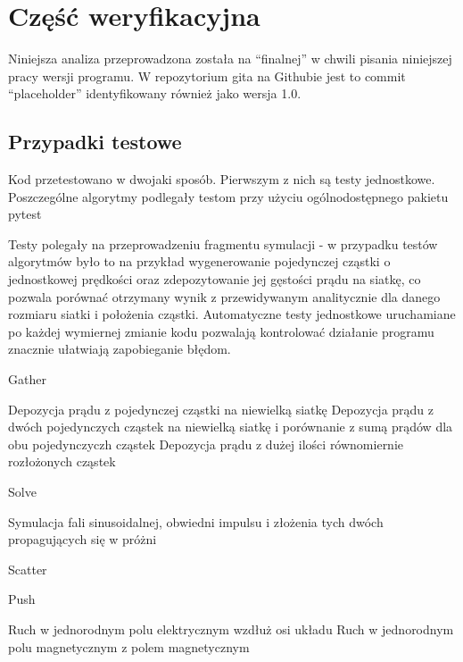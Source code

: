     \section[Weryfikacja]{Część weryfikacyjna} %
    Niniejsza analiza przeprowadzona została na ``finalnej'' w chwili pisania niniejszej pracy wersji programu.
    W repozytorium gita na Githubie jest to commit ``placeholder'' %
    identyfikowany również jako wersja 1.0.

    \subsection{Przypadki testowe}

    Kod przetestowano w dwojaki sposób. Pierwszym z nich są testy jednostkowe.
    Poszczególne algorytmy podlegały testom przy użyciu ogólnodostępnego pakietu pytest %

    Testy polegały na przeprowadzeniu fragmentu symulacji - w przypadku testów algorytmów było to na przykład wygenerowanie
    pojedynczej cząstki o jednostkowej prędkości oraz zdepozytowanie jej gęstości prądu na siatkę, co pozwala porównać
    otrzymany wynik z przewidywanym analitycznie dla danego rozmiaru siatki i położenia cząstki. Automatyczne testy
    jednostkowe uruchamiane po każdej wymiernej zmianie kodu pozwalają kontrolować działanie programu znacznie ułatwiają
    zapobieganie błędom.

    \begin{enumerate}
        \itemi Gather
            \begin{enumerate}
                \itemii Depozycja prądu z pojedynczej cząstki na niewielką siatkę
                \itemii Depozycja prądu z dwóch pojedynczych cząstek na niewielką siatkę
                    i porównanie z sumą prądów dla obu pojedynczyczh cząstek
                \itemii Depozycja prądu z dużej ilości równomiernie rozłożonych cząstek
            \end{enumerate}

        \itemi Solve
            \begin{enumerate}
                \itemii Symulacja fali sinusoidalnej, obwiedni impulsu i złożenia tych dwóch
                    propagujących się w próżni
            \end{enumerate}

        \itemi Scatter
            \begin{enumerate}
                \itemii %
            \end{enumerate}

        \itemi Push
            \begin{enumerate}
                \itemii Ruch w jednorodnym polu elektrycznym wzdłuż osi układu
                \itemii Ruch w jednorodnym polu magnetycznym z polem magnetycznym
            \end{enumerate}
    \end{enumerate}

